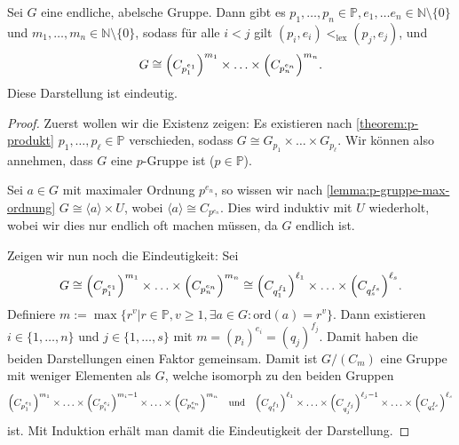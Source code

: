 \begin{theorem}
    Sei $G$ eine endliche, abelsche Gruppe. Dann gibt es $p_1, \hdots, p_n \in \mathbb{P}, e_1, \hdots e_n \in \mathbb{N} \setminus \{0\}$ und $m_1, \hdots, m_n \in \mathbb{N} \setminus \{0\}$, sodass für alle $i < j$ gilt $(p_i, e_i) <_{\text{lex}} (p_j, e_j)$, und
    $$ G \cong \Bigl( C_{p_1^{e_1}} \Bigr)^{m_1} \times \hdots \times \Bigl( C_{p_n^{e_n}} \Bigr)^{m_n}. $$
    Diese Darstellung ist eindeutig.
\end{theorem}

\begin{proof} 
    Zuerst wollen wir die Existenz zeigen: Es existieren nach \cref{theorem:p-produkt} $p_1, \hdots, p_\ell \in \mathbb{P}$ verschieden, sodass $G \cong G_{p_1} \times \hdots \times G_{p_\ell}$. Wir können also \obda annehmen, dass $G$ eine $p$-Gruppe ist ($p \in \mathbb{P}$).

    Sei $a \in G$ mit maximaler Ordnung $p^{e_n}$, so wissen wir nach \cref{lemma:p-gruppe-max-ordnung} $G \cong \langle a \rangle \times U$, wobei $\langle a \rangle \cong C_{p^{e_n}}$. Dies wird induktiv mit $U$ wiederholt, wobei wir dies nur endlich oft machen müssen, da $G$ endlich ist.

    Zeigen wir nun noch die Eindeutigkeit: Sei $$G \cong \Bigl( C_{p_1^{e_1}} \Bigr)^{m_1} \times \hdots \times \Bigl( C_{p_n^{e_n}} \Bigr)^{m_n} \cong \Bigl( C_{q_1^{f_1}} \Bigr)^{\ell_1} \times \hdots \times \Bigl( C_{q_s^{f_s}} \Bigr)^{\ell_s} .$$
    Definiere $m:=\max\{r^v| r\in\mathbb{P}, v\geq1, \exists a\in G:\mathrm{ord}(a)=r^v\}$. Dann existieren $i\in\{1,\ldots,n\}$
    und $j\in\{1,\ldots,s\}$ mit $m=(p_i)^{e_i}=(q_j)^{f_j}$. Damit haben die beiden Darstellungen einen Faktor gemeinsam. Damit ist
    $G/(C_{m})$ eine Gruppe mit weniger Elementen als $G$, welche isomorph zu den beiden Gruppen
    $$\Bigl( C_{p_1^{e_1}} \Bigr)^{m_1} \times \hdots \times \Bigl( C_{p_i^{e_i}} \Bigr)^{m_i-1} \times \hdots \times \Bigl( C_{p_n^{e_n}} \Bigr)^{m_n} \quad\text{und}\quad \Bigl( C_{q_1^{f_1}} \Bigr)^{\ell_1} \times \hdots \times\Bigl( C_{q_j^{f_j}} \Bigr)^{\ell_j-1} \times \hdots\times \Bigl( C_{q_s^{f_s}} \Bigr)^{\ell_s}$$
    ist. Mit Induktion erhält man damit die Eindeutigkeit der Darstellung.
\end{proof}

